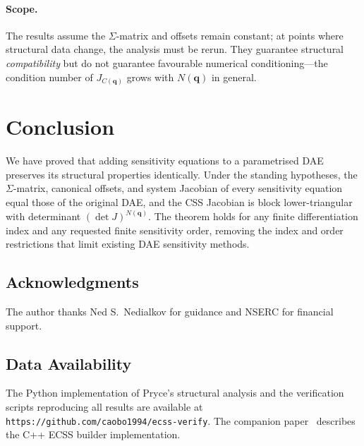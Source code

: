 \documentclass[12pt,a4paper]{article}
\theoremstyle{definition}
\theoremstyle{plain}
\theoremstyle{remark}
\newcommand{\vq}{\mathbf{q}}
\begin{document}
\paragraph{Scope.}
The results assume the $\Sigma$-matrix and offsets remain constant; at points where structural data change, the analysis must be rerun. They guarantee structural \emph{compatibility} but do not guarantee favourable numerical conditioning---the condition number of $J_{C(\vq)}$ grows with $N(\vq)$ in general.

\section{Conclusion}

We have proved that adding sensitivity equations to a parametrised DAE preserves its structural properties identically. Under the standing hypotheses, the $\Sigma$-matrix, canonical offsets, and system Jacobian of every sensitivity equation equal those of the original DAE, and the CSS Jacobian is block lower-triangular with determinant $(\det J)^{N(\vq)}$. The theorem holds for any finite differentiation index and any requested finite sensitivity order, removing the index and order restrictions that limit existing DAE sensitivity methods.

\subsection*{Acknowledgments}
The author thanks Ned S.\ Nedialkov for guidance and NSERC for financial support.

\subsection*{Data Availability}
The Python implementation of Pryce's structural analysis and the verification scripts reproducing all results are available at \texttt{https://github.com/caobo1994/ecss-verify}. The companion paper~\cite{cao2026builder} describes the C++ ECSS builder implementation.
\end{document}
